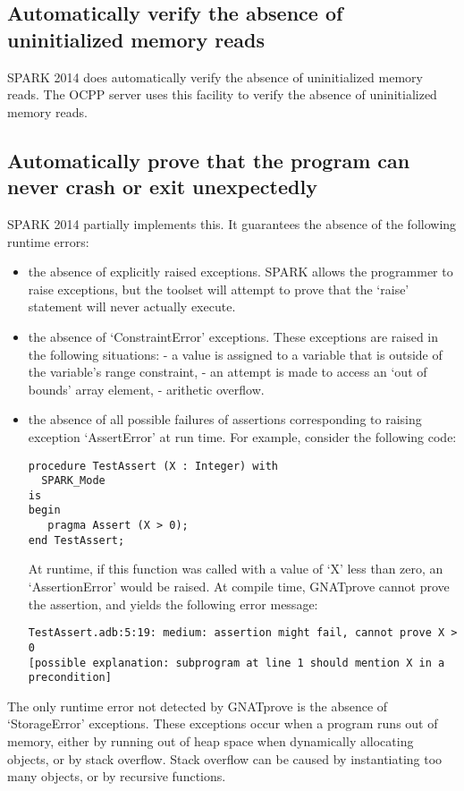 \documentclass[12pt,openany,a4paper]{book}
\begin{document}
\subsection{Automatically verify the absence of uninitialized memory reads}
SPARK 2014 does automatically verify the absence of uninitialized memory reads. The OCPP server uses this facility to verify the absence of uninitialized memory reads.

\subsection{Automatically prove that the program can never crash or exit unexpectedly}
SPARK 2014 partially implements this. It guarantees the absence of the following runtime errors:
\begin{itemize}
	\item the absence of explicitly raised exceptions. SPARK allows the programmer to raise exceptions, but the toolset will attempt to prove that the `raise' statement will never actually execute.
	\item the absence of `ConstraintError' exceptions. These exceptions are raised in the following situations:
		\subitem - a value is assigned to a variable that is outside of the variable's range constraint,
		\subitem - an attempt is made to access an `out of bounds' array element,
		\subitem - arithetic overflow.
	
	\item the absence of all possible failures of assertions corresponding to raising exception `AssertError' at run time. For example, consider the following code:
\begin{verbatim}
procedure TestAssert (X : Integer) with
  SPARK_Mode
is
begin
   pragma Assert (X > 0);
end TestAssert;
\end{verbatim}

At runtime, if this function was called with a value of `X' less than zero, an `AssertionError' would be raised. At compile time, GNATprove cannot prove the assertion, and yields the following error message:
\begin{verbatim}
TestAssert.adb:5:19: medium: assertion might fail, cannot prove X > 0 
[possible explanation: subprogram at line 1 should mention X in a precondition]
\end{verbatim}
\end{itemize}

The only runtime error not detected by GNATprove is the absence of `StorageError' exceptions. These exceptions occur when a program runs out of memory, either by running out of heap space when dynamically allocating objects, or by stack overflow. Stack overflow can be caused by instantiating too many objects, or by recursive functions. 
	
\end{document}
